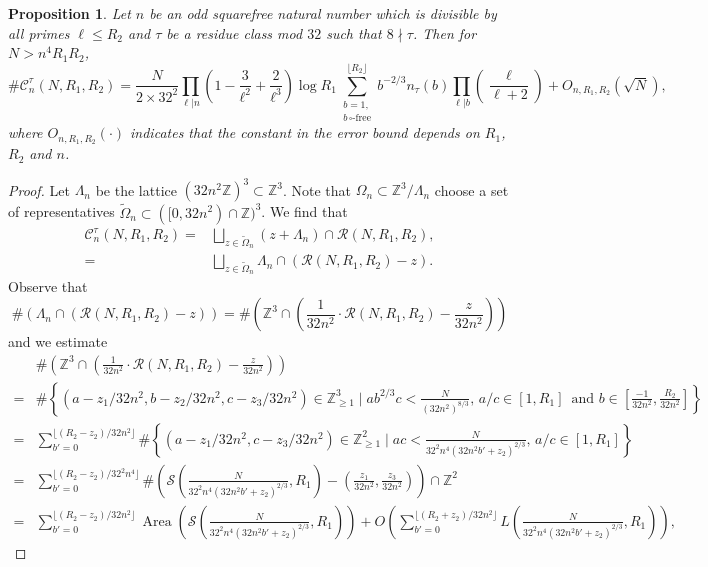 \documentclass[table]{amsart}
\newtheorem{proposition}[theorem]{Proposition}
\newcommand{\Z}{\mathbb{Z}}
\newcommand{\cC}{\mathcal{C}}
\newcommand{\op}[1]{\operatorname{#1}}
\numberwithin{equation}{section}
\begin{document}
\begin{proposition}\label{Cn estimate}
    Let $n$ be an odd squarefree natural number which is divisible by all primes $\ell\leq R_2$ and $\tau$ be a residue class mod $32$ such that $8\nmid \tau$. Then for $N>n^4 R_1 R_2$,
    \[\# \cC_n^\tau (N, R_1, R_2)=\frac{N}{2\times 32^2}\prod_{\ell|n} \left(1-\frac{3}{\ell^2}+\frac{2}{\ell^3}\right)\log R_1\sum_{\substack{b=1,\\
    b\,\square\text{-free}}}^{\lfloor R_2\rfloor}  b^{-2/3}n_\tau(b)\prod_{\ell|b}\left(\frac{\ell}{\ell+2}\right)+O_{n, R_1, R_2}(\sqrt{N}),\] where $O_{n,R_1, R_2}(\cdot)$ indicates that the constant in the error bound depends on $R_1$, $R_2$ and $n$. 
\end{proposition}
\begin{proof}
    Let $\Lambda_n$ be the lattice $(32 n^2 \Z)^3\subset \Z^3$. Note that $\Omega_n\subset \Z^3/\Lambda_n$ choose a set of representatives $\widetilde{\Omega}_n\subset ([0,32 n^2)\cap \Z)^3$. We find that 
    \[\begin{split}\mathcal{C}_n^\tau(N, R_1, R_2)=&\bigsqcup_{z\in \widetilde{\Omega}_n} (z+\Lambda_n)\cap \mathcal{R}(N, R_1, R_2),\\
    =&\bigsqcup_{z\in \widetilde{\Omega}_n} \Lambda_n \cap \left(\mathcal{R}(N, R_1, R_2)-z\right).
    \end{split}\]
    Observe that 
    \[\# \left(\Lambda_n \cap \left(\mathcal{R}(N, R_1, R_2)-z\right)\right)=\# \left(\Z^3 \cap \left(\frac{1}{32 n^2}\cdot \mathcal{R}(N, R_1, R_2)-\frac{z}{32 n^2}\right)\right)\]
    and we estimate \[
    \begin{split}& \# \left(\Z^3 \cap \left(\frac{1}{32 n^2}\cdot \mathcal{R}(N, R_1, R_2)-\frac{z}{32 n^2}\right)\right)\\
    =&\# \left\{(a-z_1/32 n^2,b-z_2/32 n^2,c-z_3/32 n^2)\in \Z_{\geq 1}^3\mid ab^{2/3}c<\frac{N}{(32n^2)^{8/3}},\, a/c\in [1, R_1]\,\text{ and } b\in \left[\frac{-1}{32 n^2}, \frac{R_2}{32 n^2}\right]\right\}\\
    =&\sum_{b'=0 }^{\lfloor (R_2-z_2)/32n^2\rfloor} \# \left\{(a-z_1/32n^2, c-z_3/32n^2)\in \Z_{\geq 1}^2\mid ac<\frac{N}{32^2n^4(32n^2b'+z_2)^{2/3}},\, a/c\in [1,R_1]\right\}\\
    =& \sum_{b'=0 }^{\lfloor (R_2-z_2)/32^2n^4\rfloor} \#\left(\mathcal{S}\left( \frac{N}{32^2n^4(32n^2b'+z_2)^{2/3}},R_1\right)-\left(\frac{z_1}{32n^2}, \frac{z_3}{32n^2}\right)\right)\cap \Z^2 \\
    =& \sum_{b'=0 }^{\lfloor (R_2-z_2)/32n^2\rfloor} \op{Area}\left(\mathcal{S}\left( \frac{N}{32^2n^4(32n^2b'+z_2)^{2/3}},R_1\right)\right)+O\left(\sum_{b'=0 }^{\lfloor (R_2+z_2)/32n^2\rfloor} L\left( \frac{N}{32^2n^4(32n^2b'+z_2)^{2/3}},R_1\right)\right),

\end{split}\]
\end{proof}
\end{document}
